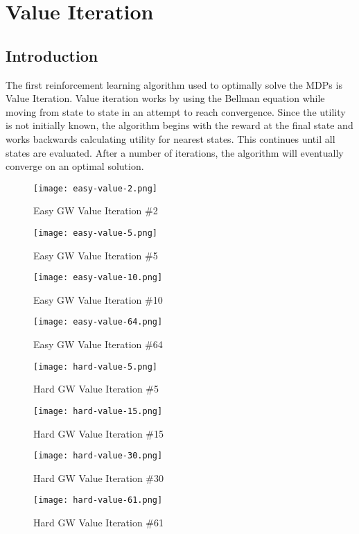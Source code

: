 \documentclass[h]{article}
\begin{document}
\section*{Value Iteration}
\subsection*{Introduction}
The first reinforcement learning algorithm used to optimally solve the MDPs is Value Iteration. 
 Value iteration works by using the Bellman equation while moving from 
 state to state in an attempt to reach convergence.  Since the utility is not 
 initially known, the algorithm begins with the reward at the final state and works 
 backwards calculating utility for nearest states.  This continues 
 until all states are evaluated.  After a number of iterations, the algorithm 
 will eventually converge on an optimal solution.
 
 
   \begin{figure}[H]
      \texttt{[image: easy-value-2.png]} 
      \caption*{Easy GW Value Iteration \#2} 
   \endminipage\hfill
      \texttt{[image: easy-value-5.png]} 
      \caption*{Easy GW Value Iteration \#5} 
   \endminipage\hfill
      \texttt{[image: easy-value-10.png]} 
      \caption*{Easy GW Value Iteration \#10} 
   \endminipage\hfill
      \texttt{[image: easy-value-64.png]} 
      \caption*{Easy GW Value Iteration \#64} 
   \endminipage\hfill
\end{figure}


   \begin{figure}[H]
      \texttt{[image: hard-value-5.png]} 
      \caption*{Hard GW Value Iteration \#5} 
   \endminipage\hfill
      \texttt{[image: hard-value-15.png]} 
      \caption*{Hard GW Value Iteration \#15} 
   \endminipage\hfill
      \texttt{[image: hard-value-30.png]} 
      \caption*{Hard GW Value Iteration \#30} 
   \endminipage\hfill
      \texttt{[image: hard-value-61.png]} 
      \caption*{Hard GW Value Iteration \#61} 
   \endminipage\hfill
\end{figure}
\end{document}
